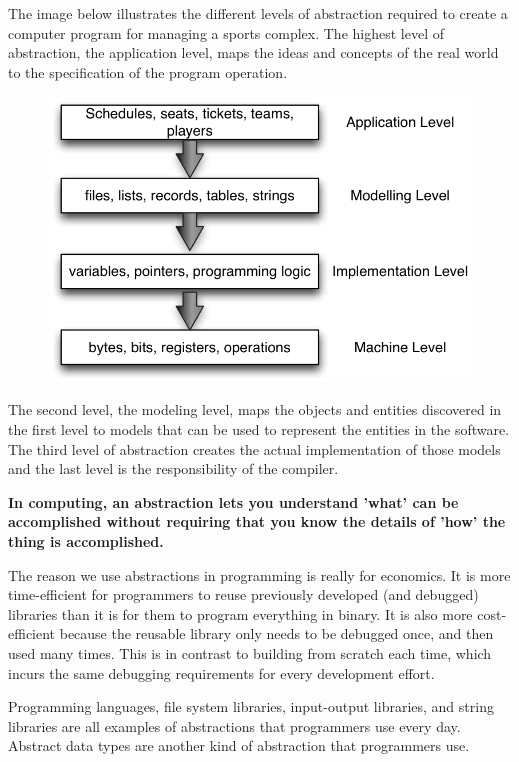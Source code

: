 The image below illustrates the different levels of abstraction required to create a computer program for managing a sports complex. The highest level of abstraction, the application level, maps the ideas and concepts of the real world to the specification of the program operation.

\begin{figure}[H]
\centering
\includegraphics{pictures/abstraction01.png}
\label{fig:sportsComplex}
\end{figure}

The second level, the modeling level, maps the objects and entities discovered in the first level to models that can be used to represent the entities in the software. The third level of abstraction creates the actual implementation of those models and the last level is the responsibility of the compiler.

\textbf{In computing, an abstraction lets you understand 'what' can be accomplished without requiring that you know the details of 'how' the thing is accomplished.}

The reason we use abstractions in programming is really for economics. It is more time-efficient for programmers to reuse previously developed (and debugged) libraries than it is for them to program everything in binary. It is also more cost-efficient because the reusable library only needs to be debugged once, and then used many times. This is in contrast to building from scratch each time, which incurs the same debugging requirements for every development effort.

Programming languages, file system libraries, input-output libraries, and string libraries are all examples of abstractions that programmers use every day. Abstract data types 
are another kind of abstraction that programmers use.

